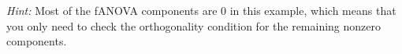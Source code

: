 {\begin{enumerate}[a)]
        \textit{Hint:} Most of the fANOVA components are 0 in this example, which means that you only need to check the orthogonality condition for the remaining nonzero components.
\end{enumerate}


}